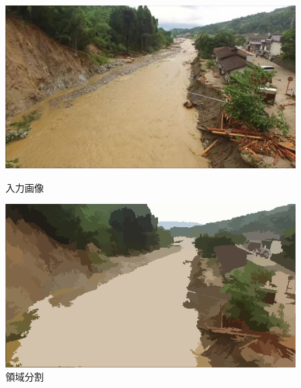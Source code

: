 \documentclass[a4paper, twocolumn, xelatex, 9pt, ja=standard, Ligatures=TeX]{bxjsarticle}
\begin{document}
	\begin{figure}[b]
		\begin{minipage}{0.48\hsize}
			\centering
			\includegraphics[width=\linewidth]{img/original.png}
			\caption{入力画像}
			\label{img02}
		\end{minipage}
		\begin{minipage}{0.48\hsize}
			\centering
			\includegraphics[width=\linewidth]{img/meanshift.png}
			\caption{領域分割}
			\label{img03}
		\end{minipage}
	\end{figure}
\end{document}
